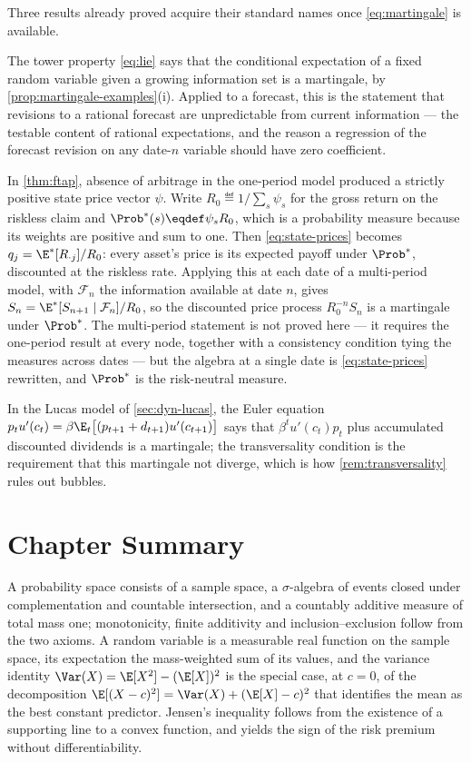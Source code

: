 \begin{remark}\label{rem:martingale-econ}
	Three results already proved acquire their standard names once
	\eqref{eq:martingale} is available.

	The tower property \eqref{eq:lie} says that the conditional expectation of a
	fixed random variable given a growing information set is a martingale, by
	\autoref{prop:martingale-examples}(i). Applied to a forecast, this is the
	statement that revisions to a rational forecast are unpredictable from current
	information --- the testable content of rational expectations, and the reason a
	regression of the forecast revision on any date-$n$ variable should have zero
	coefficient.

	In \autoref{thm:ftap}, absence of arbitrage in the one-period model produced a
	strictly positive state price vector $\psi$. Write
	$R_0\eqdef1/\sum_s\psi_s$ for the gross return on the riskless claim and
	$\Prob^{\ast}(s)\eqdef\psi_sR_0$, which is a probability measure because its
	weights are positive and sum to one. Then \eqref{eq:state-prices} becomes
	$q_j=\E^{\ast}[R_{\cdot j}]/R_0$: every asset's price is its expected payoff
	under $\Prob^{\ast}$, discounted at the riskless rate. Applying this at each
	date of a multi-period model, with $\mathcal{F}_n$ the information available at
	date $n$, gives $S_n=\E^{\ast}[S_{n+1}\mid\mathcal{F}_n]/R_0$, so the discounted
	price process $R_0^{-n}S_n$ is a martingale under $\Prob^{\ast}$. The
	multi-period statement is not proved here --- it requires the one-period result
	at every node, together with a consistency condition tying the measures across
	dates --- but the algebra at a single date is \eqref{eq:state-prices} rewritten,
	and $\Prob^{\ast}$ is the risk-neutral measure.

	In the Lucas model of \autoref{sec:dyn-lucas}, the Euler equation
	$p_t u'(c_t)=\beta\E_t\bigl[(p_{t+1}+d_{t+1})u'(c_{t+1})\bigr]$ says that
	$\beta^{t}u'(c_t)p_t$ plus accumulated discounted dividends is a martingale;
	the transversality condition is the requirement that this martingale not
	diverge, which is how \autoref{rem:transversality} rules out bubbles.
\end{remark}

\section{Chapter Summary}\label{sec:prob-summary}

A probability space consists of a sample space, a $\sigma$-algebra of events
closed under complementation and countable intersection, and a countably additive
measure of total mass one; monotonicity, finite additivity and
inclusion--exclusion follow from the two axioms. A random variable is a
measurable real function on the sample space, its expectation the mass-weighted
sum of its values, and the variance identity
$\Var(X)=\E[X^{2}]-(\E[X])^{2}$ is the special case, at $c=0$, of the
decomposition $\E[(X-c)^{2}]=\Var(X)+(\E[X]-c)^{2}$ that identifies the mean as
the best constant predictor. Jensen's inequality follows from the existence of a
supporting line to a convex function, and yields the sign of the risk premium
without differentiability.

